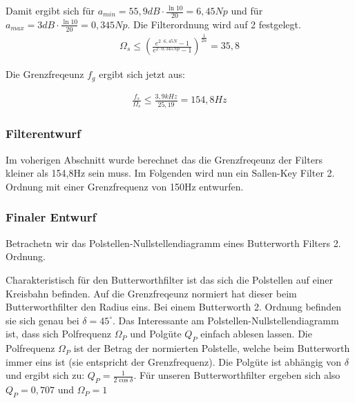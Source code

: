 \documentclass[11pt,twoside,a4paper,openright]{mpreport}
\begin{document}
Damit ergibt sich für $a_{min}=55,9 dB\cdot \frac{\ln{10}}{20}=6,45Np$ und für  $a_{max}=3 dB\cdot \frac{\ln{10}}{20}=0,345Np$. Die Filterordnung wird auf 2 festgelegt.
\begin{align}
\Omega_s \le  \left(\frac{e^{2\cdot6,45N }-1}{e^{2\cdot 0,345Np}-1}\right)^{\frac{1}{2n}}  = 35,8
\end{align}

Die Grenzfreqeunz $f_g$ ergibt sich jetzt aus:

\begin{align}
\frac{f_s}{\Omega_s} \le \frac{3,9kHz}{25,19} = 154,8Hz
\end{align}

\subsubsection{Filterentwurf}
Im voherigen Abschnitt wurde berechnet das die Grenzfreqeunz der Filters kleiner als 154,8Hz sein muss.
Im Folgenden wird nun ein Sallen-Key Filter 2. Ordnung mit einer Grenzfrequenz von 150Hz entwurfen.


\subsubsection{Finaler Entwurf}



Betrachetn wir das Polstellen-Nullstellendiagramm eines Butterworth Filters 2. Ordnung.


Charakteristisch für den Butterworthfilter ist das sich die Polstellen auf einer Kreisbahn befinden. Auf die Grenzfreqeunz normiert hat dieser beim Butterworthfilter den Radius
eins. Bei einem Butterworth 2. Ordnung befinden sie sich genau bei $\delta=45^\circ$. Das Interessante am Polstellen-Nullstellendiagramm ist, dass sich Polfrequenz $\Omega_P$ und 
Polgüte $Q_P$ einfach ablesen lassen. Die Polfrequenz $\Omega_P$ ist der Betrag der normierten Polstelle, welche beim Butterworth immer eins ist (sie entspricht der Grenzfrequenz).
Die Polgüte ist abhängig von $\delta$ und ergibt sich zu: $Q_P=\frac{1}{2\cos{\delta}}$. Für unseren Butterworthfilter ergeben sich also $Q_P=0,707$ und $\Omega_P=1$
\end{document}
